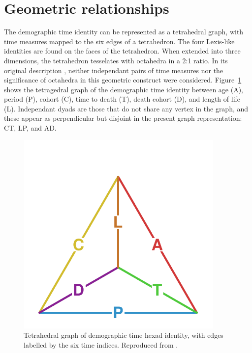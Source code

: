 \section{Geometric relationships}
The demographic time identity can be represented as a tetrahedral graph, with time measures mapped to the six edges of a tetrahedron. The four Lexis-like identities are found on the faces of the tetrahedron. When extended into three dimensions, the tetrahedron tesselates with octahedra in a 2:1 ratio. In its original description \citep{riffe2017demographictime}, neither independant pairs of time measures nor the significance of octahedra in this geometric construct were considered. Figure~\ref{fig:tet} shows the tetragedral graph of the demographic time identity between age (A), period (P), cohort (C), time to death (T), death cohort (D), and length of life (L). Independant dyads are those that do not share any vertex in the graph, and these appear as perpendicular but disjoint in the present graph representation: CT, LP, and AD.

\begin{figure}[h!]
\centering
\includegraphics[width=4in]{Figures/TetraHedronEdgesOnly.pdf}
\caption{Tetrahedral graph of demographic time hexad identity, with edges
labelled by the six time indices. Reproduced from 
\citet{riffe2017demographictime}.}
\label{fig:tet}
\end{figure}

